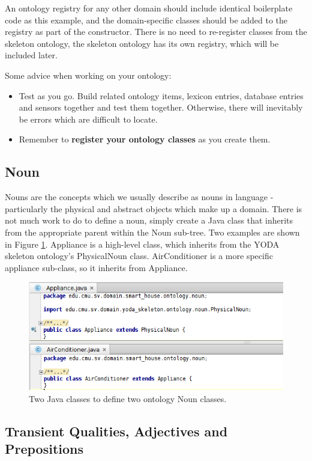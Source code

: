 \documentclass[titlepage]{article}
\begin{document}
An ontology registry for any other domain should include identical boilerplate code as this example, and the domain-specific classes should be added to the registry as part of the constructor.
There is no need to re-register classes from the skeleton ontology, the skeleton ontology has its own registry, which will be included later.

Some advice when working on your ontology:
\begin{itemize}
\item Test as you go. 
Build related ontology items, lexicon entries, database entries and sensors together and test them together. 
Otherwise, there will inevitably be errors which are difficult to locate.
\item Remember to \textbf{register your ontology classes} as you create them.
\end{itemize}


\subsection{Noun}
Nouns are the concepts which we usually describe as nouns in language - particularly the physical and abstract objects which make up a domain.
There is not much work to do to define a noun, simply create a Java class that inherits from the appropriate parent within the Noun sub-tree.
Two examples are shown in Figure \ref{fig:nouns}.
Appliance is a high-level class, which inherits from the YODA skeleton ontology's PhysicalNoun class.
AirConditioner is a more specific appliance sub-class, so it inherits from Appliance.

\begin{figure}[!]
\centering
\includegraphics[width=.75\textwidth]{Nouns}
\caption{Two Java classes to define two ontology Noun classes.}
\label{fig:nouns}
\end{figure}



\subsection{Transient Qualities, Adjectives and Prepositions}
\end{document}
